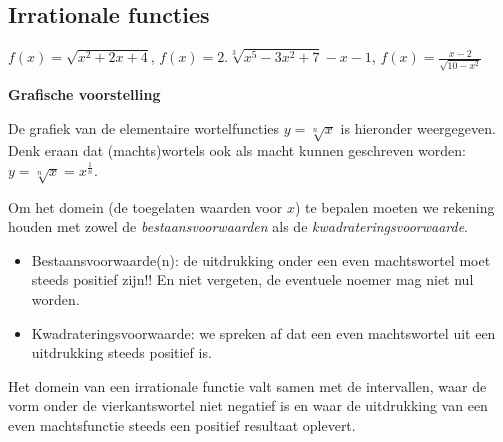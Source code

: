 \subsection{Irrationale functies}

\begin{voorbeeld}
	$f(x)=\sqrt{x^{2}+2x+4}$, $f(x)=2.\sqrt[3]{x^{5}-3x^{2}+7}-x-1$,
$f(x)=\frac{x-2}{\sqrt{10-x^{2}}}$
\end{voorbeeld}

\textbf{Grafische voorstelling}

De grafiek van de elementaire wortelfuncties $y=\sqrt[n]{x}$
is hieronder weergegeven. Denk eraan dat (machts)wortels ook als macht
kunnen geschreven worden: $y=\sqrt[n]{x}=x^{\frac{1}{n}}$.


Om het domein (de toegelaten waarden voor $x$) te bepalen moeten
we rekening houden met zowel de \emph{bestaansvoorwaarden} als de
\emph{kwadrateringsvoorwaarde}.

\begin{itemize}
	\item Bestaansvoorwaarde(n): de uitdrukking onder een even machtswortel
moet steeds positief zijn!! En niet vergeten, de eventuele noemer
mag niet nul worden.
\item Kwadrateringsvoorwaarde: we spreken af dat een even machtswortel uit
een uitdrukking steeds positief is.
\end{itemize}

Het domein van een irrationale functie valt samen met de intervallen,
waar de vorm onder de vierkantswortel niet negatief is en waar de
uitdrukking van een even machtsfunctie steeds een positief resultaat
oplevert.


